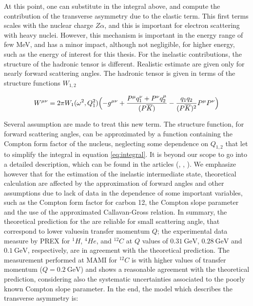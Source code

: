 At this point, one can substitute in the integral above, and compute the contribution of the transverse asymmetry due to the elastic term. This first terms scales with the nuclear charge $Z\alpha$, and this is important for electron scattering with heavy nuclei. However, this mechanism is important in the energy range of few MeV, and has a minor impact, although not negligible, for higher energy, such as the energy of interest for this thesis.
For the inelastic contributions, the structure of the hadronic tensor is different. Realistic estimate are given only for nearly forward scattering angles. The hadronic tensor is given in terms of the structure functions $W_{1,2}$

\begin{equation}
W^{\mu \nu} = 2 \pi W_{1}(\omega^{2},Q_{1}^{2}) \Bigl( -g^{\mu \nu} + \dfrac{P^{\mu}q_{1}^{\nu} +  P^{\nu}q_{2}^{\mu}}{(P \overline{K})} - \dfrac{q_{1} q_{2}}{(P \overline{K})^{2}}P^{\mu}P^{\nu} \Bigl)
\end{equation}

Several assumption are made to treat this new term. The structure function, for forward scattering angles, can be approximated by a function containing the Compton form factor of the nucleus, neglecting some dependence on $Q_{1,2}$ that let to simplify the integral in equation \ref{eq:integral}. It is beyond our scope to go into a detailed description, which can be found in the articles (\cite{Gorchtein_2006}, \cite{Gorchtein_2008}, \cite{Koshchii_2021}). We emphasize however that for the estimation of the inelastic intermediate state, theoretical calculation are affected by the approximation of forward angles and other assumptions due to lack of data in the dependence of some important variables, such as the Compton form factor for carbon 12, the Compton slope parameter and the use of the approximated Callavan-Gross relation. In summary, the theoretical prediction for the \transv are reliable for small scattering angle, that correspond to lower values ​​in transfer momentum $Q$; the experimental data measure by PREX \cite{HAPPEX:2012fud} for $^{1}H$, $^{4}He$, and $^{12}C$ at $Q$ values of $\SI{0.31}{\giga \electronvolt}$, $\SI{0.28}{\giga \electronvolt}$ and $\SI{0.1}{\giga \electronvolt}$, respectively, are in agreement with the theoretical prediction. The measurement performed at MAMI for $^{12}C$ \cite{Esser:2018vdp} is with higher values of transfer momentum ($Q = \SI{0.2}{\giga \electronvolt}$) and shows a reasonable agreement with the theoretical prediction, considering also the systematic uncertainties associated to the poorly known Compton slope parameter. In the end, the model which describes the transverse asymmetry is:


